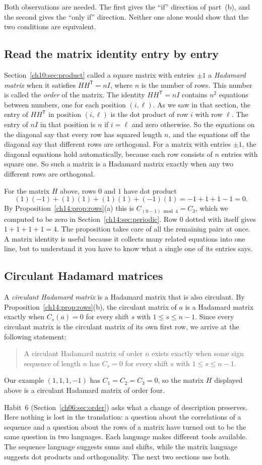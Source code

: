 Both observations are needed. The first gives the ``if'' direction of part~(b), and the second gives the ``only if'' direction. Neither one alone would show that the two conditions are equivalent.

\subsection*{Read the matrix identity entry by entry}
Section~\ref{ch10:sec:product} called a square matrix with entries $\pm1$ a \emph{Hadamard matrix} when it satisfies $HH^{\mathsf T}=nI$, where $n$ is the number of rows. This number is called the \emph{order} of the matrix. The identity $HH^{\mathsf T}=nI$ contains $n^2$ equations between numbers, one for each position $(i,\ell)$. As we saw in that section, the entry of $HH^{\mathsf T}$ in position $(i,\ell)$ is the dot product of row $i$ with row $\ell$. The entry of $nI$ in that position is $n$ if $i=\ell$ and zero otherwise. So the equations on the diagonal say that every row has squared length $n$, and the equations off the diagonal say that different rows are orthogonal. For a matrix with entries $\pm1$, the diagonal equations hold automatically, because each row consists of $n$ entries with square one. So such a matrix is a Hadamard matrix exactly when any two different rows are orthogonal.

For the matrix $H$ above, rows $0$ and $1$ have dot product
\[
(1)(-1)+(1)(1)+(1)(1)+(-1)(1)=-1+1+1-1=0.
\]
By Proposition~\ref{ch14:prop:rows}(a) this is $C_{(0-1)\bmod4}=C_3$, which we computed to be zero in Section~\ref{ch14:sec:periodic}. Row $0$ dotted with itself gives $1+1+1+1=4$. The proposition takes care of all the remaining pairs at once. A matrix identity is useful because it collects many related equations into one line, but to understand it you have to know what a single one of its entries says.

\subsection*{Circulant Hadamard matrices}
A \emph{circulant Hadamard matrix} is a Hadamard matrix that is also circulant. By Proposition~\ref{ch14:prop:rows}(b), the circulant matrix of $a$ is a Hadamard matrix exactly when $C_s(a)=0$ for every shift $s$ with $1\le s\le n-1$. Since every circulant matrix is the circulant matrix of its own first row, we arrive at the following statement:
\begin{quote}
A circulant Hadamard matrix of order $n$ exists exactly when some sign sequence of length $n$ has $C_s=0$ for every shift $s$ with $1\le s\le n-1$.
\end{quote}
Our example $(1,1,1,-1)$ has $C_1=C_2=C_3=0$, so the matrix $H$ displayed above is a circulant Hadamard matrix of order four.

Habit~6 (Section~\ref{ch06:sec:order}) asks what a change of description preserves. Here nothing is lost in the translation: a question about the correlations of a sequence and a question about the rows of a matrix have turned out to be the same question in two languages. Each language makes different tools available. The sequence language suggests sums and shifts, while the matrix language suggests dot products and orthogonality. The next two sections use both.
